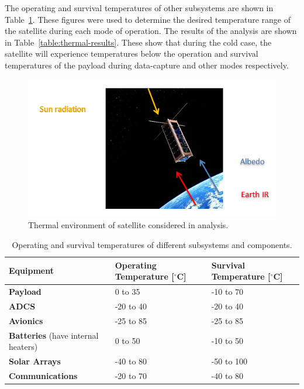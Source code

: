 \documentclass[12pt]{article}
\begin{document}
The operating and survival temperatures of other subsystems are shown in Table~\ref{table:thermal-inputs}. These figures were used to determine the desired temperature range of the satellite during each mode of operation. The results of the analysis are shown in Table~\ref{table:thermal-results}. These show that during the cold case, the satellite will experience temperatures below the operation and survival temperatures of the payload during data-capture and other modes respectively.

\begin{figure}[ht]%
\centering
\includegraphics{images/thermal-environment}%
\caption{Thermal environment of satellite considered in analysis.\cite{satnews}}%
\label{fig:thermal-environment}%
\end{figure}

\begin{table}[ht]%
\caption{Operating and survival temperatures of different subsystems and components.}
\label{table:thermal-inputs}
\begin{tabular}{|p{1.5in}|l|l|}\hline
\textbf{Equipment} & \textbf{Operating Temperature} [$^\circ$C] & \textbf{Survival Temperature} [$^\circ$C] \\\hline
\textbf{Payload} & 0 to 35 & -10 to 70 \\\hline
\textbf{ADCS} & -20 to 40 & -20 to 40 \\\hline
\textbf{Avionics} & -25 to 85 & -25 to 85\\\hline
\textbf{Batteries} (have internal heaters) & 0 to 50 & -10 to 50\\\hline
\textbf{Solar Arrays} & -40 to 80  & -50 to 100 \\\hline
\textbf{Communications} & -20 to 70 & -40 to 80 \\\hline
\end{tabular}
\end{table}
\end{document}
